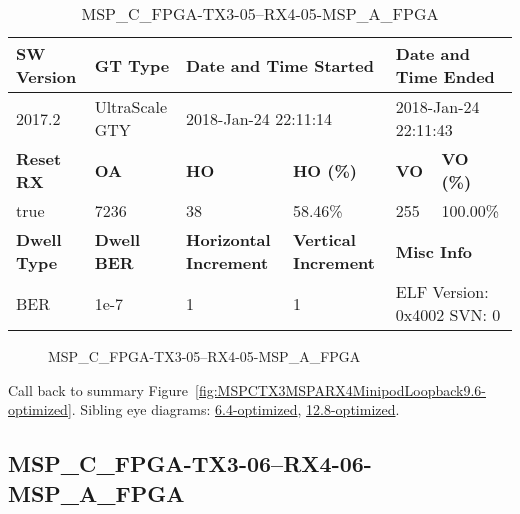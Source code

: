 \begin{table}[h]
\centering
\caption{MSP\_C\_FPGA-TX3-05--RX4-05-MSP\_A\_FPGA}
\label{tab:MSPCFPGATX305RX405MSPAFPGA9.6-optimized}
\begin{tabular}{@{}|l|l|l|l|l|l|@{}}
\toprule
\textbf{SW Version}                & \textbf{GT Type}   & \multicolumn{2}{l|}{\textbf{Date and Time Started}}            & \multicolumn{2}{l|}{\textbf{Date and Time Ended}}        \\ \midrule
2017.2                       & UltraScale GTY          & \multicolumn{2}{l|}{2018-Jan-24 22:11:14}                   & \multicolumn{2}{l|}{2018-Jan-24 22:11:43}               \\ \midrule
\textbf{Reset RX}                  & \textbf{OA} & \textbf{HO}   & \textbf{HO (\%)} & \textbf{VO} & \textbf{VO (\%)} \\ \midrule
true & 7236        & 38          & 58.46\%        & 255        & 100.00\%       \\ \midrule
\textbf{Dwell Type}                & \textbf{Dwell BER} & \textbf{Horizontal Increment} & \textbf{Vertical Increment}    & \multicolumn{2}{l|}{\textbf{Misc Info}}                  \\ \midrule
BER                            & 1e-7        & 1        & 1           & \multicolumn{2}{l|}{ELF Version: 0x4002 SVN: 0}                         \\ \bottomrule
\end{tabular}
\end{table}

\begin{figure}[h]
\caption{MSP\_C\_FPGA-TX3-05--RX4-05-MSP\_A\_FPGA} \label{fig:MSPCFPGATX305RX405MSPAFPGA9.6-optimized}
\end{figure}

Call back to summary Figure~\ref{fig:MSPCTX3MSPARX4MinipodLoopback9.6-optimized}.
Sibling eye diagrams: \hyperref[sec:MSPCFPGATX305RX405MSPAFPGA6.4-optimized]{6.4-optimized}, \hyperref[sec:MSPCFPGATX305RX405MSPAFPGA12.8-optimized]{12.8-optimized}.

\clearpage
\newpage


\subsection{MSP\_C\_FPGA-TX3-06--RX4-06-MSP\_A\_FPGA}\label{sec:MSPCFPGATX306RX406MSPAFPGA9.6-optimized}

